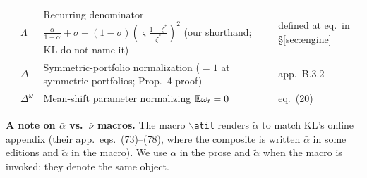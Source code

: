 \begin{longtable}{@{}p{2.55cm} p{2.0cm} p{7.2cm} p{2.4cm}@{}}
                 & $\Lambda$                & Recurring denominator $\tfrac{\alpha}{1-\alpha}+\sigma+(1-\sigma)(\varsigma\tfrac{1+\zeta^*}{\zeta^*})^2$ (our shorthand; KL do not name it) & defined at eq.~in \S\ref{sec:engine} \\
                 & $\Delta$                 & Symmetric-portfolio normalization ($=1$ at symmetric portfolios; Prop.\ 4 proof) & app.\ B.3.2 \\
                 & $\Delta^{\omega}$        & Mean-shift parameter normalizing $\mathbb{E}\omega_t=0$                                 & eq.\ (20) \\
\end{longtable}

\medskip
\noindent\textbf{A note on $\bar\alpha$ vs.\ $\bar\nu$ macros.} The macro
\(\backslash\)\texttt{atil} renders \(\tilde\alpha\) to match KL's online
appendix (their app.\ eqs.\ (73)--(78), where the composite is written
\(\bar\alpha\) in some editions and \(\tilde\alpha\) in the macro). We use
\(\bar\alpha\) in the prose and \(\tilde\alpha\) when the macro is invoked; they
denote the same object. 
